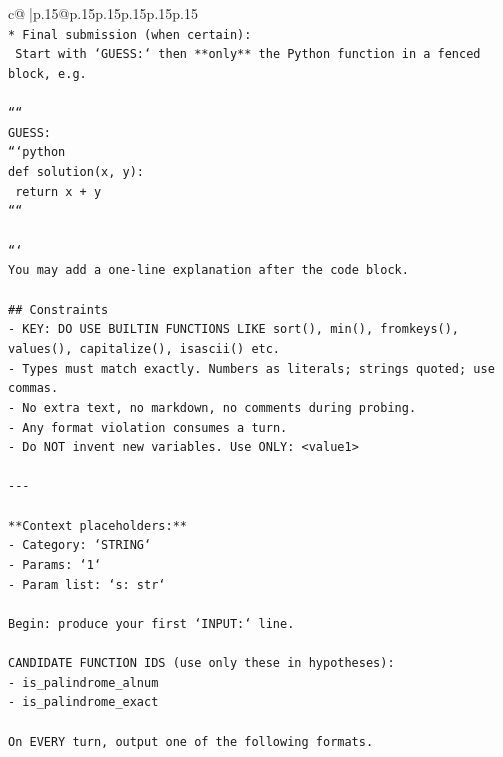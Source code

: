 \documentclass{article}
\begin{document}
{\begin{supertabular}{c@{$\;$}|p{.15\linewidth}@{}p{.15\linewidth}p{.15\linewidth}p{.15\linewidth}p{.15\linewidth}p{.15\linewidth}}
{{{\\ 
\texttt{* Final submission (when certain):} \\
\texttt{  Start with `GUESS:` then **only** the Python function in a fenced block, e.g.} \\
\\ 
\texttt{````} \\
\texttt{GUESS:} \\
\texttt{```python} \\
\texttt{def solution(x, y):} \\
\texttt{    return x + y} \\
\texttt{````} \\
\\ 
\texttt{```} \\
\texttt{You may add a one{-}line explanation after the code block.} \\
\\ 
\texttt{\#\# Constraints} \\
\texttt{{-} KEY: DO USE BUILTIN FUNCTIONS LIKE sort(), min(), fromkeys(), values(), capitalize(), isascii() etc.} \\
\texttt{{-} Types must match exactly. Numbers as literals; strings quoted; use commas.} \\
\texttt{{-} No extra text, no markdown, no comments during probing.} \\
\texttt{{-} Any format violation consumes a turn.} \\
\texttt{{-} Do NOT invent new variables. Use ONLY: <value1>} \\
\\ 
\texttt{{-}{-}{-}} \\
\\ 
\texttt{**Context placeholders:**} \\
\texttt{{-} Category: `STRING`} \\
\texttt{{-} Params: `1`} \\
\texttt{{-} Param list: `s: str`} \\
\\ 
\texttt{Begin: produce your first `INPUT:` line.} \\
\\ 
\texttt{CANDIDATE FUNCTION IDS (use only these in hypotheses):} \\
\texttt{{-} is\_palindrome\_alnum} \\
\texttt{{-} is\_palindrome\_exact} \\
\\ 
\texttt{On EVERY turn, output one of the following formats.} \\
}}}
\end{supertabular}}
\end{document}
